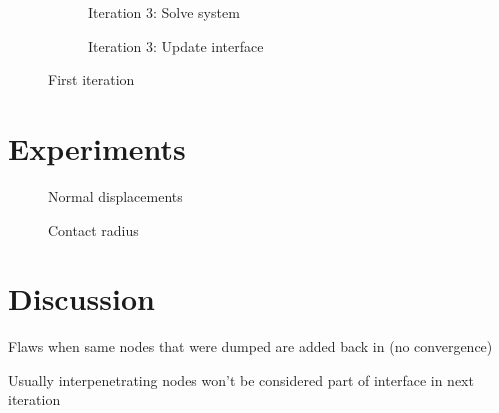 \documentclass[11pt, a4paper]{article}
\begin{document}
\begin{figure}[ht]
\begin{subfigure}[b]{.32\linewidth}
    \end{subfigure}
    \begin{subfigure}[b]{.32\linewidth}
        
        \caption{Iteration 3: Solve system}\label{fig:example-iter2-solution}
    \end{subfigure}
    \begin{subfigure}[b]{.32\linewidth}
        
        \caption{Iteration 3: Update interface}\label{fig:example-iter2-dumping}
    \end{subfigure}
    \caption{First iteration}
    \label{fig:example-iter2}
\end{figure}

\cite{deparis}

\section{Experiments}
\label{sec:experiments}

\begin{figure}[ht]
   \centering
    
    \caption{Normal displacements}
    \label{fig:normal-displacements}
\end{figure}

\begin{figure}[ht]
    \centering
     
     \caption{Contact radius}
     \label{fig:contact-radius}
 \end{figure}
 
\section{Discussion}
\label{sec:discussion}

Flaws when same nodes that were dumped are added back in (no convergence) 

Usually interpenetrating nodes won't be considered part of interface in next iteration


\end{document}
